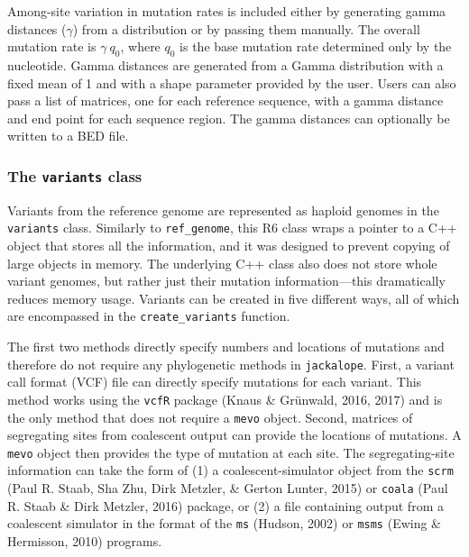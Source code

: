 \documentclass[12pt,]{article}
\begin{document}
Among-site variation in mutation rates is included either by generating
gamma distances (\(\gamma\)) from a distribution or by passing them
manually. The overall mutation rate is \(\gamma ~ q_{0}\), where
\(q_{0}\) is the base mutation rate determined only by the nucleotide.
Gamma distances are generated from a Gamma distribution with a fixed
mean of 1 and with a shape parameter provided by the user. Users can
also pass a list of matrices, one for each reference sequence, with a
gamma distance and end point for each sequence region. The gamma
distances can optionally be written to a BED file.

\hypertarget{the-variants-class}{%
\subsubsection{\texorpdfstring{The \texttt{variants}
class}{The variants class}}\label{the-variants-class}}

Variants from the reference genome are represented as haploid genomes in
the \texttt{variants} class. Similarly to \texttt{ref\_genome}, this R6
class wraps a pointer to a C++ object that stores all the information,
and it was designed to prevent copying of large objects in memory. The
underlying C++ class also does not store whole variant genomes, but
rather just their mutation information---this dramatically reduces
memory usage. Variants can be created in five different ways, all of
which are encompassed in the \texttt{create\_variants} function.

The first two methods directly specify numbers and locations of
mutations and therefore do not require any phylogenetic methods in
\texttt{jackalope}. First, a variant call format (VCF) file can directly
specify mutations for each variant. This method works using the
\texttt{vcfR} package (Knaus \& Grünwald, 2016, 2017) and is the only
method that does not require a \texttt{mevo} object. Second, matrices of
segregating sites from coalescent output can provide the locations of
mutations. A \texttt{mevo} object then provides the type of mutation at
each site. The segregating-site information can take the form of (1) a
coalescent-simulator object from the \texttt{scrm} (Paul R. Staab, Sha
Zhu, Dirk Metzler, \& Gerton Lunter, 2015) or \texttt{coala} (Paul R.
Staab \& Dirk Metzler, 2016) package, or (2) a file containing output
from a coalescent simulator in the format of the \texttt{ms} (Hudson,
2002) or \texttt{msms} (Ewing \& Hermisson, 2010) programs.
\end{document}
